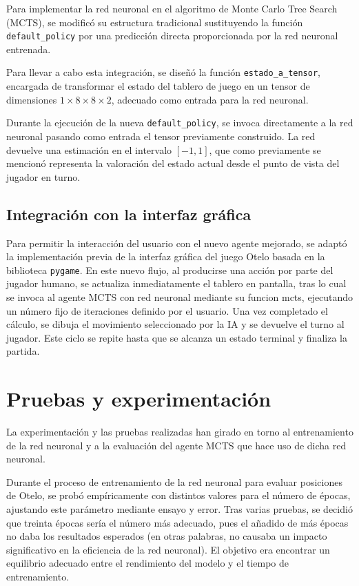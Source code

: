 \documentclass[conference]{IEEEtran}
\begin{document}
Para implementar la red neuronal en el algoritmo de Monte Carlo Tree Search (MCTS), se modificó su estructura tradicional sustituyendo la función \texttt{default\_policy} por una predicción directa proporcionada por la red neuronal entrenada. 

Para llevar a cabo esta integración, se diseñó la función \texttt{estado\_a\_tensor}, encargada de transformar el estado del tablero de juego en un tensor de dimensiones $1 \times 8 \times 8 \times 2$, adecuado como entrada para la red neuronal. 

Durante la ejecución de la nueva \texttt{default\_policy}, se invoca directamente a la red neuronal pasando como entrada el tensor previamente construido. La red devuelve una estimación en el intervalo $[-1, 1]$, que como previamente se mencionó representa la valoración del estado actual desde el punto de vista del jugador en turno. 

\subsection{Integración con la interfaz gráfica}

Para permitir la interacción del usuario con el nuevo agente mejorado, se adaptó la implementación previa de la interfaz gráfica del juego Otelo basada en la biblioteca \texttt{pygame}. En este nuevo flujo, al producirse una acción por parte del jugador humano, se actualiza inmediatamente el tablero en pantalla, tras lo cual se invoca al agente MCTS con red neuronal mediante su funcion mcts, ejecutando un número fijo de iteraciones definido por el usuario. Una vez completado el cálculo, se dibuja el movimiento seleccionado por la IA y se devuelve el turno al jugador. Este ciclo se repite hasta que se alcanza un estado terminal y finaliza la partida.

\section{Pruebas y experimentación}
La experimentación y las pruebas realizadas han girado en torno al entrenamiento de la red neuronal y a la evaluación del agente MCTS que hace uso de dicha red neuronal.

Durante el proceso de entrenamiento de la red neuronal para evaluar posiciones de Otelo, se probó empíricamente con distintos valores para el número de épocas, ajustando este parámetro mediante ensayo y error. Tras varias pruebas, se decidió que treinta épocas sería el número más adecuado, pues el añadido de más épocas no daba los resultados esperados (en otras palabras, no causaba un impacto significativo en la eficiencia de la red neuronal). El objetivo era encontrar un equilibrio adecuado entre el rendimiento del modelo y el tiempo de entrenamiento.
\end{document}
